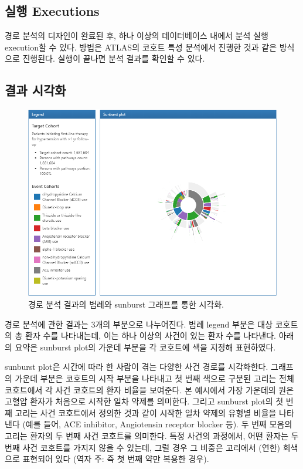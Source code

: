 \documentclass[10.5pt]{book}
\theoremstyle{definition}
\theoremstyle{definition}
\theoremstyle{definition}
\theoremstyle{remark}
\begin{document}
\subsection{실행 Executions}\label{-executions}

경로 분석의 디자인이 완료된 후, 하나 이상의 데이터베이스 내에서 분석
실행 execution할 수 있다. 방법은 ATLAS의 코호트 특성 분석에서 진행한
것과 같은 방식으로 진행된다. 실행이 끝나면 분석 결과를 확인할 수 있다.

\subsection{결과 시각화}\label{-}

\begin{figure}

{\centering \includegraphics[width=1\linewidth]{images/Characterization/atlasPathwaysResults} 

}

\caption{경로 분석 결과의 범례와 sunburst 그래프를 통한 시각화.}\label{fig:atlasPathwaysResults}
\end{figure}

경로 분석에 관한 결과는 3개의 부분으로 나누어진다. 범례 legend 부분은
대상 코호트의 총 환자 수를 나타내는데, 이는 하나 이상의 사건이 있는 환자
수를 나타낸다. 아래의 요약은 sunburst plot의 가운데 부분을 각 코호트에
색을 지정해 표현하였다.

sunburst plot은 시간에 따라 한 사람이 겪는 다양한 사건 경로를
시각화한다. 그래프의 가운데 부분은 코호트의 시작 부분을 나타내고 첫 번째
색으로 구분된 고리는 전체 코호트에서 각 사건 코호트의 환자 비율을
보여준다. 본 예시에서 가장 가운데의 원은 고혈압 환자가 처음으로 시작한
일차 약제를 의미한다. 그리고 sunburst plot의 첫 번째 고리는 사건
코호트에서 정의한 것과 같이 시작한 일차 약제의 유형별 비율을 나타낸다
(예를 들어, ACE inhibitor, Angiotensin receptor blocker 등). 두 번째
모음의 고리는 환자의 두 번째 사건 코호트를 의미한다. 특정 사건의
과정에서, 어떤 환자는 두 번째 사건 코호트를 가지지 않을 수 있는데, 그럴
경우 그 비중은 고리에서 (연한) 회색으로 표현되어 있다 (역자 주: 즉 첫
번째 약만 복용한 경우).
\end{document}
